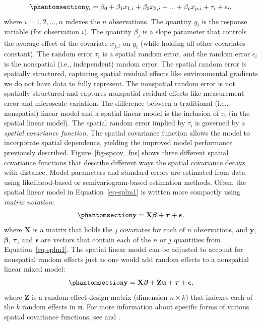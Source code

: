 \documentclass[
  letterpaper,
  DIV=11,
  numbers=noendperiod]{scrartcl}
\begin{document}
\begin{equation}\phantomsection\label{eq-splm1}{
y_i = \beta_0 + \beta_1x_{1, i} + \beta_2x_{2, i} + ... + \beta_p x_{p, i} + \tau_i + \epsilon_i,
}\end{equation} where \(i = 1, 2, ..., n\) indexes the \(n\)
observations. The quantity \(y_i\) is the response variable (for
observation \(i\)). The quantity \(\beta_j\) is a slope parameter that
controls the average effect of the covariate \(x_{j, i}\) on \(y_i\)
(while holding all other covariates constant). The random error
\(\tau_i\) is a spatial random error, and the random error
\(\epsilon_i\) is the nonspatial (i.e., independent) random error. The
spatial random error is spatially structured, capturing spatial residual
effects like environmental gradients we do not have data to fully
represent. The nonspatial random error is not spatially structured and
captures nonspatial residual effects like measurement error and
microscale variation. The difference between a traditional (i.e.,
nonspatial) linear model and a spatial linear model is the inclusion of
\(\tau_i\) (in the spatial linear model). The spatial random error
implied by \(\tau_i\) is governed by a \emph{spatial covariance
function}. The spatial covariance function allows the model to
incorporate spatial dependence, yielding the improved model performance
previously described. Figure~\ref{fig-spcov_fns} shows three different
spatial covariance functions that describe different ways the spatial
covariance decays with distance. Model parameters and standard errors
are estimated from data using likelihood-based
\citep{patterson1971recovery, harville1977maximum, wolfinger1994computing}
or semivariogram-based \citep{cressie1985fitting, curriero1999composite}
estimation methods. Often, the spatial linear model in
Equation~\ref{eq-splm1} is written more compactly using \emph{matrix
notation}: \begin{equation}\phantomsection\label{eq-splm2}{
\mathbf{y} = \mathbf{X} \boldsymbol{\beta} + \boldsymbol{\tau} + \boldsymbol{\epsilon},
}\end{equation} where \(\mathbf{X}\) is a matrix that holds the \(j\)
covariates for each of \(n\) observations, and \(\mathbf{y}\),
\(\boldsymbol{\beta}\), \(\boldsymbol{\tau}\), and
\(\boldsymbol{\epsilon}\) are vectors that contain each of the \(n\) or
\(j\) quantities from Equation~\ref{eq-splm1}. The spatial linear model
can be adjusted to account for nonspatial random effects just as one
would add random effects to a nonspatial linear mixed model:
\begin{equation}\phantomsection\label{eq-splm3}{
\mathbf{y} = \mathbf{X} \boldsymbol{\beta} + \mathbf{Z}\mathbf{u} + \boldsymbol{\tau} + \boldsymbol{\epsilon},
}\end{equation} where \(\mathbf{Z}\) is a random effect design matrix
(dimension \(n \times k\)) that indexes each of the \(k\) random effects
in \(\mathbf{u}\). For more information about specific forms of various
spatial covariance functions, see \citet{schabenberger2017statistical}
and \citet{zimmerman2024spatial}.
\end{document}
